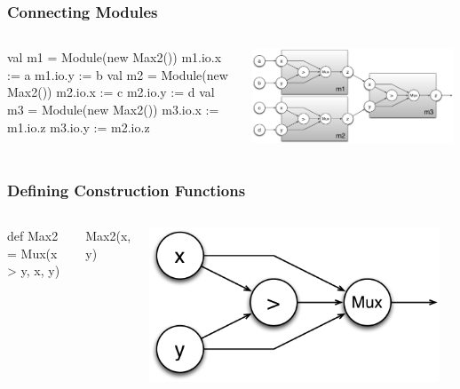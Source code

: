 \documentclass[xcolor=pdflatex,dvipsnames,table]{beamer}
\begin{document}
\begin{frame}[fragile]
\frametitle{Connecting Modules}

\begin{columns}
\begin{scala}
val m1 = 
  Module(new Max2())
m1.io.x := a
m1.io.y := b
val m2 = 
  Module(new Max2())
m2.io.x := c
m2.io.y := d
val m3 = 
  Module(new Max2())
m3.io.x := m1.io.z
m3.io.y := m2.io.z
\end{scala}


\begin{center}
\includegraphics[width=0.99\textwidth]{figs/Max4.pdf} \\
\end{center}
\end{columns}

\end{frame}


\begin{frame}[fragile]
\frametitle{Defining Construction Functions}

\begin{columns}


\begin{scala}
def Max2 = Mux(x > y, x, y)
\end{scala}
\begin{scala}
Max2(x, y)
\end{scala}


\begin{center}
\includegraphics[width=0.95\textwidth]{figs/Max2.pdf} \\[1cm]
\end{center}

\end{columns}

\end{frame}
\end{document}
